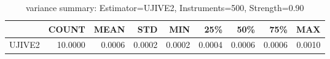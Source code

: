 \begin{table}[ht]
\centering
\caption{variance summary: Estimator=UJIVE2, Instruments=500, Strength=0.90}
\begin{tabular}{lrrrrrrrr}
\toprule
 & COUNT & MEAN & STD & MIN & 25\% & 50\% & 75\% & MAX \\
\midrule
UJIVE2 & 10.0000 & 0.0006 & 0.0002 & 0.0002 & 0.0004 & 0.0006 & 0.0006 & 0.0010 \\
\bottomrule
\end{tabular}
\end{table}
